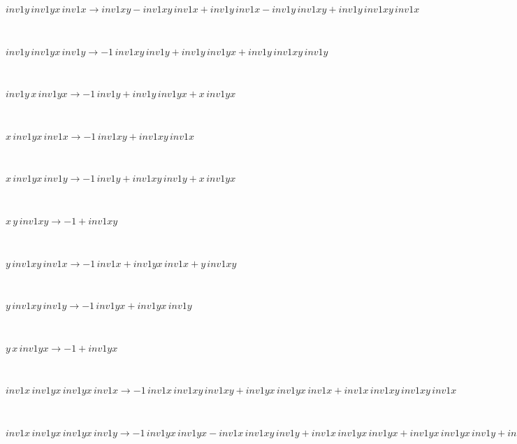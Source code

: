 \documentclass[rep10,leqno]{report}
\begin{document}
\begin{minipage}{6in}
$
inv1y\,
 inv1yx\,
 inv1x\rightarrow inv1xy - inv1xy\,
 inv1x + inv1y\,
 inv1x - inv1y\,
 inv1xy + inv1y\,
 inv1xy\,
 inv1x
$
\end{minipage}\medskip \\
\begin{minipage}{6in}
$
inv1y\,
 inv1yx\,
 inv1y\rightarrow -1\,
 inv1xy\,
 inv1y + inv1y\,
 inv1yx + inv1y\,
 inv1xy\,
 inv1y
$
\end{minipage}\medskip \\
\begin{minipage}{6in}
$
inv1y\,
 x\,
 inv1yx\rightarrow -1\,
 inv1y + inv1y\,
 inv1yx + x\,
 inv1yx
$
\end{minipage}\medskip \\
\begin{minipage}{6in}
$
x\,
 inv1yx\,
 inv1x\rightarrow -1\,
 inv1xy + inv1xy\,
 inv1x
$
\end{minipage}\medskip \\
\begin{minipage}{6in}
$
x\,
 inv1yx\,
 inv1y\rightarrow -1\,
 inv1y + inv1xy\,
 inv1y + x\,
 inv1yx
$
\end{minipage}\medskip \\
\begin{minipage}{6in}
$
x\,
 y\,
 inv1xy\rightarrow -1 + inv1xy
$
\end{minipage}\medskip \\
\begin{minipage}{6in}
$
y\,
 inv1xy\,
 inv1x\rightarrow -1\,
 inv1x + inv1yx\,
 inv1x + y\,
 inv1xy
$
\end{minipage}\medskip \\
\begin{minipage}{6in}
$
y\,
 inv1xy\,
 inv1y\rightarrow -1\,
 inv1yx + inv1yx\,
 inv1y
$
\end{minipage}\medskip \\
\begin{minipage}{6in}
$
y\,
 x\,
 inv1yx\rightarrow -1 + inv1yx
$
\end{minipage}\medskip \\
\begin{minipage}{6in}
$
inv1x\,
 inv1yx\,
 inv1yx\,
 inv1x\rightarrow -1\,
 inv1x\,
 inv1xy\,
 inv1xy + inv1yx\,
 inv1yx\,
 inv1x + inv1x\,
 inv1xy\,
 inv1xy\,
 inv1x
$
\end{minipage}\medskip \\
\begin{minipage}{6in}
$
inv1x\,
 inv1yx\,
 inv1yx\,
 inv1y\rightarrow -1\,
 inv1yx\,
 inv1yx - inv1x\,
 inv1xy\,
 inv1y + inv1x\,
 inv1yx\,
 inv1yx + inv1yx\,
 inv1yx\,
 inv1y + inv1x\,
 inv1xy\,
 inv1xy\,
 inv1y
$
\end{minipage}\medskip \\
\end{document}

